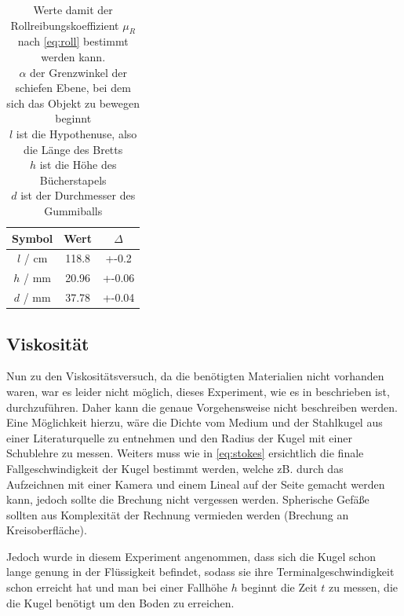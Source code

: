 \documentclass[11pt,ngerman]{scrartcl}
\begin{document}
\begin{table}[H]
    \centering
    \caption{Werte damit der Rollreibungskoeffizient $\mu_R$ nach
        \autoref{eq:roll} bestimmt werden 
    kann. \\
    $\alpha$ der Grenzwinkel der schiefen Ebene, bei dem sich das Objekt zu bewegen beginnt\\
    $l$ ist die Hypothenuse, also die Länge des Bretts \\
    $h$ ist die Höhe des Bücherstapels \\
    $d$ ist der Durchmesser des Gummiballs \\
}
    \label{tab:messwerte_roll}
    \begin{tabular}{c|S|S}
        Symbol & {Wert} & {$\Delta$} \\ \hline
        $l$ / \si{\cm} & 118.8 & +-0.2 \\
        $h$ / \si{\mm} & 20.96 & +-0.06\\
        $d$ / \si{\mm} & 37.78 & +-0.04\\
    \end{tabular}
\end{table}

\subsection{Viskosität}
Nun zu den Viskositätsversuch, da die benötigten Materialien nicht vorhanden waren, war es leider nicht möglich, dieses
Experiment, wie es in  beschrieben ist, durchzuführen.
Daher kann die genaue Vorgehensweise nicht beschreiben werden. 
Eine Möglichkeit hierzu, wäre die Dichte vom Medium und der Stahlkugel
aus einer Literaturquelle zu entnehmen und den Radius der Kugel mit einer Schublehre zu messen. 
Weiters muss wie in \autoref{eq:stokes} ersichtlich die 
finale Fallgeschwindigkeit der Kugel bestimmt werden, 
welche zB. durch das Aufzeichnen mit einer Kamera und 
einem Lineal auf der Seite gemacht werden kann, jedoch 
sollte die Brechung nicht vergessen werden. Spherische
Gefäße sollten aus Komplexität der Rechnung vermieden werden (Brechung an Kreisoberfläche).

Jedoch wurde in diesem Experiment angenommen, dass sich die Kugel 
schon lange genung in der Flüssigkeit befindet, sodass sie
ihre Terminalgeschwindigkeit schon erreicht hat und 
man bei einer Fallhöhe $h$ beginnt die Zeit $t$ zu messen,
die die Kugel benötigt um den Boden zu erreichen.
\end{document}

